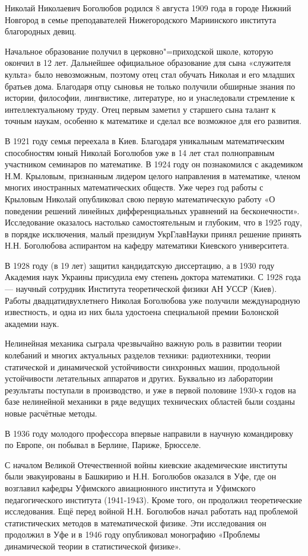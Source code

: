 Николай Николаевич Боголюбов родился 8 августа 1909 года в городе Нижний Новгород в семье преподавателей Нижегородского Мариинского института благородных девиц.

Начальное образование получил в церковно"=приходской школе, которую окончил в 12 лет. Дальнейшее официальное образование для сына «служителя культа» было невозможным, поэтому отец стал обучать Николая и его младших братьев дома. Благодаря отцу сыновья не только получили обширные знания по истории, философии, лингвистике, литературе, но и унаследовали стремление к интеллектуальному труду. Отец первым заметил у старшего сына талант к точным наукам, особенно к математике и сделал все возможное для его развития.

В 1921 году семья переехала в Киев. Благодаря уникальным математическим способностям юный Николай Боголюбов уже в 14 лет стал полноправным участником семинаров по математике. В 1924 году он познакомился с академиком Н.М. Крыловым, признанным лидером целого направления в математике, членом многих иностранных математических обществ. Уже через год работы с Крыловым Николай опубликовал свою первую математическую работу «О поведении решений линейных дифференциальных уравнений на бесконечности». Исследование оказалось настолько самостоятельным и глубоким, что в 1925 году, в порядке исключения, малый президиум УкрГлавНауки принял решение принять Н.Н. Боголюбова аспирантом на кафедру математики Киевского университета.

В 1928 году (в 19 лет) защитил кандидатскую диссертацию, а в 1930 году Академия наук Украины присудила ему степень доктора математики. С 1928 года — научный сотрудник Института теоретической физики АН УССР (Киев). Работы двадцатидвухлетнего Николая Боголюбова уже получили международную известность, и одна из них была удостоена специальной премии Болонской академии наук.

Нелинейная механика сыграла чрезвычайно важную роль в развитии теории колебаний и многих актуальных разделов техники: радиотехники, теории статической и динамической устойчивости синхронных машин, продольной устойчивости летательных аппаратов и других. Буквально из лаборатории результаты поступали в производство, и уже в первой половине 1930-х годов на базе         нелинейной механики в ряде ведущих технических областей были созданы новые расчётные методы.

В 1936 году молодого профессора впервые направили в научную командировку по Европе, он побывал в Берлине, Париже, Брюсселе.

С началом Великой Отечественной войны киевские академические институты были эвакуированы в Башкирию и Н.Н. Боголюбов оказался в Уфе, где он возглавил кафедры Уфимского авиационного института и Уфимского педагогического института (1941-1943). Кроме того, он продолжил теоретические исследования. Ещё перед войной Н.Н. Боголюбов начал работать над проблемой статистических методов в математической физике. Эти исследования он продолжил в Уфе и в 1946 году опубликовал монографию «Проблемы динамической теории в статистической физике».

